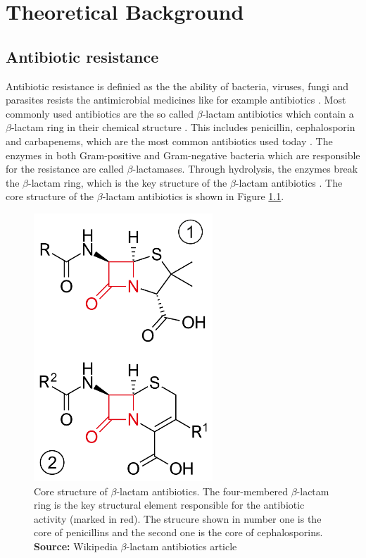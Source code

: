 \chapter{Theoretical Background}

\section{Antibiotic resistance}

Antibiotic resistance is definied as the the ability of bacteria, viruses, fungi and parasites resists the antimicrobial medicines like for example antibiotics \cite{who_antibiotic_resistance}. Most commonly used antibiotics are the so called $\beta$-lactam antibiotics which contain a $\beta$-lactam ring in their chemical structure \cite{bush2013}. This includes penicillin, cephalosporin and carbapenems, which are the most common antibiotics used today \cite{versporten2018}. The enzymes in both Gram-positive and Gram-negative bacteria which are responsible for the resistance are called $\beta$-lactamases. Through hydrolysis, the enzymes break the $\beta$-lactam ring, which is the key structure of the $\beta$-lactam antibiotics \cite{ambler1980}. The core structure of the $\beta$-lactam antibiotics is shown in Figure \ref{fig:beta_lactam_antibiotics}.

\begin{figure}[htbp]
    \centering
    \includegraphics[width=0.6\textwidth]{resources/images/beta_lactam_antibiotics_example.png}
    \caption{Core structure of $\beta$-lactam antibiotics. The four-membered $\beta$-lactam ring is the key structural element responsible for the antibiotic activity (marked in red). The strucure shown in number one is the core of penicillins and the second one is the core of cephalosporins. \textbf{Source:} Wikipedia $\beta$-lactam antibiotics article \cite{wikipedia_beta_lactam_antibiotics}}
    \label{fig:beta_lactam_antibiotics}
\end{figure}

